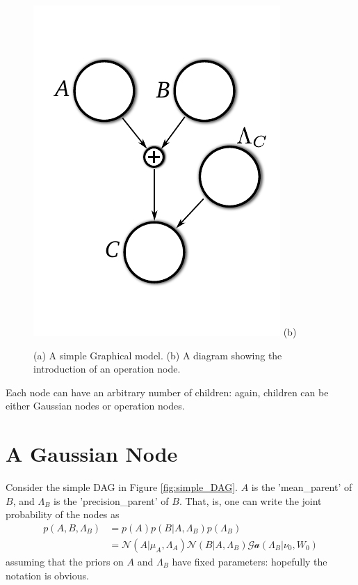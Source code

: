 \documentclass{article}
\newcommand{\<}{\langle}
\renewcommand{\>}{\rangle}
\begin{document}
\begin{figure}
\begin{minipage}{0.4\textwidth}
\begin{center}
\includegraphics[width=\textwidth]{images/gm_bastard}
(b)
\end{center}
\end{minipage}
\caption{(a) A simple Graphical model.  (b) A diagram showing the introduction of an operation node.}
\label{fig:gm_true_bastard}
\end{figure}


Each node can have an arbitrary number of children: again, children can be either Gaussian nodes or operation nodes. 



\section{A Gaussian Node}
Consider the simple DAG in Figure \ref{fig:simple_DAG}.  $A$ is the 'mean\_parent' of $B$, and $\Lambda_B$ is the 'precision\_parent' of $B$. That, is, one can write the joint probability of the nodes as
\begin{equation}
\begin{split}
p(A,B,\Lambda_B) &= p(A) p(B | A, \Lambda_B) p(\Lambda_B)\\
&= \mathcal N (A|\mu_A, \Lambda_A) \mathcal N (B | A, \Lambda_B) \mathcal {Ga}(\Lambda_B | \nu_0, W_0)
\end{split}
\end{equation}
assuming that the priors on $A$ and $\Lambda_B$ have fixed parameters: hopefully the notation is obvious.  
\end{document}
